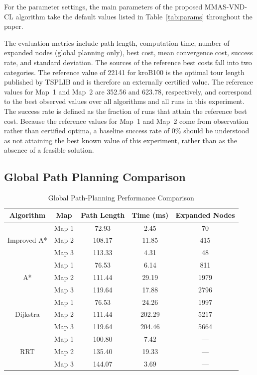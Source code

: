 \documentclass[lettersize,journal]{IEEEtran}
\begin{document}
For the parameter settings, the main parameters of the proposed MMAS-VND-CL algorithm take the default values listed in Table~\textcolor{blue}{\ref{tab:params}} throughout the paper.

The evaluation metrics include path length, computation time, number of expanded nodes (global planning only), best cost, mean convergence cost, success rate, and standard deviation. The sources of the reference best costs fall into two categories. The reference value of 22141 for kroB100 is the optimal tour length published by TSPLIB and is therefore an externally certified value. The reference values for Map~1 and Map~2 are 352.56 and 623.78, respectively, and correspond to the best observed values over all algorithms and all runs in this experiment. The success rate is defined as the fraction of runs that attain the reference best cost. Because the reference values for Map~1 and Map~2 come from observation rather than certified optima, a baseline success rate of 0\% should be understood as not attaining the best known value of this experiment, rather than as the absence of a feasible solution.

\subsection{Global Path Planning Comparison}
\label{subsec:exp_plan}

\begin{table}[!ht]
\caption{Global Path-Planning Performance Comparison}
\label{tab:plan}
\centering
\footnotesize
\setlength{\tabcolsep}{4pt}
\begin{tabular}{ccccc}
\toprule
Algorithm & Map & Path Length & Time (ms) & Expanded Nodes \\
\midrule
\multirow{3}{*}{Improved A*}
& Map 1 & 72.93 & 2.45 & 70 \\
& Map 2 & 108.17 & 11.85 & 415 \\
& Map 3 & 113.33 & 4.31 & 48 \\
\midrule
\multirow{3}{*}{A*}
& Map 1 & 76.53 & 6.14 & 811 \\
& Map 2 & 111.44 & 29.19 & 1979 \\
& Map 3 & 119.64 & 17.88 & 2796 \\
\midrule
\multirow{3}{*}{Dijkstra}
& Map 1 & 76.53 & 24.26 & 1997 \\
& Map 2 & 111.44 & 202.29 & 5217 \\
& Map 3 & 119.64 & 204.46 & 5664 \\
\midrule
\multirow{3}{*}{RRT}
& Map 1 & 100.80 & 7.42 & --- \\
& Map 2 & 135.40 & 19.33 & --- \\
& Map 3 & 144.07 & 3.69 & --- \\
\bottomrule
\end{tabular}
\end{table}
\end{document}
